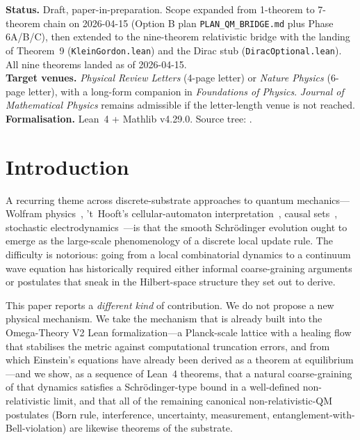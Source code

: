\documentclass[11pt,a4paper,twoside]{article}
\theoremstyle{definition}
\newcommand{\code}[1]{\texttt{#1}}
\begin{document}
\noindent\textbf{Status.} Draft, paper-in-preparation. Scope expanded
from 1-theorem to 7-theorem chain on 2026-04-15 (Option B plan
\code{PLAN\_QM\_BRIDGE.md} plus Phase 6A/B/C), then extended to the
nine-theorem relativistic bridge with the landing of Theorem~9
(\code{KleinGordon.lean}) and the Dirac stub
(\code{DiracOptional.lean}). All nine theorems landed as of
2026-04-15.\\
\textbf{Target venues.} \emph{Physical Review Letters} (4-page letter) or
\emph{Nature Physics} (6-page letter), with a long-form companion in
\emph{Foundations of Physics}. \emph{Journal of Mathematical Physics}
remains admissible if the letter-length venue is not reached.\\
\textbf{Formalisation.} Lean~4 + Mathlib v4.29.0. Source tree:
.

\tableofcontents

\section{Introduction}\label{sec:intro}

A recurring theme across discrete-substrate approaches to quantum
mechanics---Wolfram physics~\cite{Wolfram2020}, 't~Hooft's
cellular-automaton interpretation~\cite{tHooft2014,tHooft2016}, causal
sets~\cite{BombelliLeeMeyerSorkin1987}, stochastic
electrodynamics~\cite{dePenaCetto1996}---is that the smooth Schr\"odinger
evolution ought to emerge as the large-scale phenomenology of a discrete
local update rule. The difficulty is notorious: going from a local
combinatorial dynamics to a continuum wave equation has historically
required either informal coarse-graining arguments or postulates that
sneak in the Hilbert-space structure they set out to derive.

This paper reports a \emph{different kind} of contribution. We do not
propose a new physical mechanism. We take the mechanism that is already
built into the Omega-Theory V2 Lean formalization---a Planck-scale
lattice with a healing flow that stabilises the metric against
computational truncation errors, and from which Einstein's equations
have already been derived as a theorem at equilibrium---and we show, as
a sequence of Lean~4 theorems, that a natural coarse-graining of that
dynamics satisfies a Schr\"odinger-type bound in a well-defined
non-relativistic limit, and that all of the remaining canonical
non-relativistic-QM postulates (Born rule, interference, uncertainty,
measurement, entanglement-with-Bell-violation) are likewise theorems of
the substrate.
\end{document}
